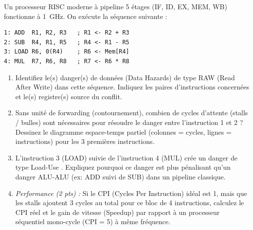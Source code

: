 \documentclass[11pt]{article}
\begin{document}
\begin{exercice}
Un processeur RISC moderne à pipeline 5 étages (IF, ID, EX, MEM, WB) fonctionne à \SI{1}{\giga\hertz}. On exécute la séquence suivante :
\begin{verbatim}
1: ADD  R1, R2, R3   ; R1 <- R2 + R3
2: SUB  R4, R1, R5   ; R4 <- R1 - R5
3: LOAD R6, 0(R4)    ; R6 <- Mem[R4]
4: MUL  R7, R6, R8   ; R7 <- R6 * R8
\end{verbatim}
\begin{enumerate}
    \item Identifiez le(s) danger(s) de données (Data Hazards) de type RAW (Read After Write) dans cette séquence. Indiquez les paires d'instructions concernées et le(s) registre(s) source du conflit.
    \item Sans unité de \og forwarding \fg (contournement), combien de cycles d'attente (stalls / bulles) sont nécessaires pour résoudre le danger entre l'instruction 1 et 2 ? Dessinez le diagramme espace-temps partiel (colonnes = cycles, lignes = instructions) pour les 3 premières instructions.
    \item L'instruction 3 (LOAD) suivie de l'instruction 4 (MUL) crée un danger de type \og Load-Use \fg. Expliquez pourquoi ce danger est plus pénalisant qu'un danger ALU-ALU (ex: ADD suivi de SUB) dans un pipeline classique.
    \item \textit{Performance (2 pts) :} Si le CPI (Cycles Per Instruction) idéal est 1, mais que les stalls ajoutent 3 cycles au total pour ce bloc de 4 instructions, calculez le CPI réel et le gain de vitesse (Speedup) par rapport à un processeur séquentiel mono-cycle (CPI = 5) à même fréquence.
\end{enumerate}
\end{exercice}
\end{document}
